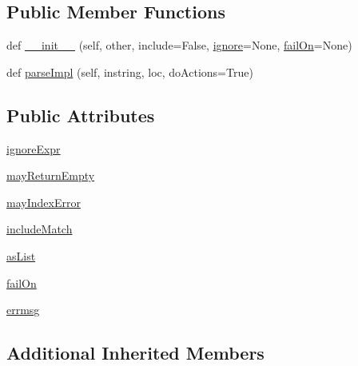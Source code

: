 \subsection*{Public Member Functions}
\begin{DoxyCompactItemize}
\item 
def \hyperlink{classpkg__resources_1_1__vendor_1_1pyparsing_1_1SkipTo_abd30b2c32b599407621f2114b6ba1c14}{\+\_\+\+\_\+init\+\_\+\+\_\+} (self, other, include=False, \hyperlink{classpkg__resources_1_1__vendor_1_1pyparsing_1_1ParseElementEnhance_a231b3fb1c8e2eaeef3e2945185d8c005}{ignore}=None, \hyperlink{classpkg__resources_1_1__vendor_1_1pyparsing_1_1SkipTo_a64bd202f0a1574332177d81d6f1c7f16}{fail\+On}=None)
\item 
def \hyperlink{classpkg__resources_1_1__vendor_1_1pyparsing_1_1SkipTo_af67786e5f860dd91924d312432d43af3}{parse\+Impl} (self, instring, loc, do\+Actions=True)
\end{DoxyCompactItemize}
\subsection*{Public Attributes}
\begin{DoxyCompactItemize}
\item 
\hyperlink{classpkg__resources_1_1__vendor_1_1pyparsing_1_1SkipTo_aba87387b4e4ff66d7c6ac2f62a1131dd}{ignore\+Expr}
\item 
\hyperlink{classpkg__resources_1_1__vendor_1_1pyparsing_1_1SkipTo_ae89db83bfd10c2c9e91772eeda635f19}{may\+Return\+Empty}
\item 
\hyperlink{classpkg__resources_1_1__vendor_1_1pyparsing_1_1SkipTo_af25363e9ca3be339000f3667551f23ba}{may\+Index\+Error}
\item 
\hyperlink{classpkg__resources_1_1__vendor_1_1pyparsing_1_1SkipTo_a43982812393206782d23d1c80fb07e3f}{include\+Match}
\item 
\hyperlink{classpkg__resources_1_1__vendor_1_1pyparsing_1_1SkipTo_ae8cbae4460fd18f02f8441ec5ef6a05d}{as\+List}
\item 
\hyperlink{classpkg__resources_1_1__vendor_1_1pyparsing_1_1SkipTo_a64bd202f0a1574332177d81d6f1c7f16}{fail\+On}
\item 
\hyperlink{classpkg__resources_1_1__vendor_1_1pyparsing_1_1SkipTo_ab5fabcbd146159871d9234ba7d46058c}{errmsg}
\end{DoxyCompactItemize}
\subsection*{Additional Inherited Members}


